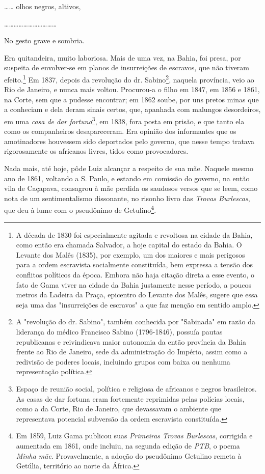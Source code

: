 \ldots{}\ldots{} olhos negros, altivos,

\ldots\ldots\ldots\ldots\ldots\ldots\ldots\ldots\ldots\ldots\ldots{}

No gesto grave e sombria.

Era quitandeira, muito laboriosa. Mais de uma vez, na Bahia, foi presa,
por suspeita de envolver-se em planos de insurreições de escravos, que
não tiveram efeito.\footnote{A década de 1830 foi especialmente
  agitada e revoltosa na cidade da Bahia, como então era chamada
  Salvador, a hoje capital do estado da Bahia. O Levante dos Malês
  (1835), por exemplo, um dos maiores e mais perigosos para a ordem
  escravista socialmente constituída, bem expressa a tensão dos
  conflitos políticos da época. Embora não haja citação direta a esse
  evento, o fato de Gama viver na cidade da Bahia justamente nesse
  período, a poucos metros da Ladeira da Praça, epicentro do Levante dos
  Malês, sugere que essa seja uma das "insurreições de escravos" a que
  faz menção em sentido amplo.} Em 1837, depois da revolução do dr.
Sabino\footnote{A "revolução do dr. Sabino", também conhecida por
  "Sabinada" em razão da liderança do médico Francisco Sabino
  (1796-1846), possuía pautas republicanas e reivindicava maior
  autonomia da então província da Bahia frente ao Rio de Janeiro, sede
  da administração do Império, assim como a redivisão de poderes locais,
  incluindo grupos com baixa ou nenhuma representação política.},
naquela província, veio ao Rio de Janeiro, e nunca mais voltou.
Procurou-a o filho em 1847, em 1856 e 1861, na Corte, sem que a pudesse
encontrar; em 1862 soube, por uns pretos minas que a conheciam e dela
deram sinais certos, que, apanhada com malungos desordeiros, em uma
\emph{casa de dar fortuna}\footnote{Espaço de reunião social, política
  e religiosa de africanos e negros brasileiros. As casas de dar fortuna
  eram fortemente reprimidas pelas polícias locais, como a da Corte, Rio
  de Janeiro, que devassavam o ambiente que representava potencial
  subversão da ordem escravista constituída.}, em 1838, fora posta em
prisão, e que tanto ela como os companheiros desapareceram. Era opinião
dos informantes que os amotinadores houvessem sido deportados pelo
governo, que nesse tempo tratava rigorosamente os africanos livres,
tidos como provocadores.

Nada mais, até hoje, pôde Luiz alcançar a respeito de sua mãe. Naquele
mesmo ano de 1861, voltando a S. Paulo, e estando em comissão do
governo, na então vila de Caçapava, consagrou à mãe perdida os saudosos
versos que se leem, como nota de um sentimentalismo dissonante, no
risonho livro das \emph{Trovas Burlescas}, que deu à lume com o
pseudônimo de Getulino\footnote{Em 1859, Luiz Gama publicou suas
  \emph{Primeiras Trovas Burlescas}, corrigida e aumentada em 1861, onde
  incluiu, na segunda edição de \emph{PTB}, o poema \emph{Minha mãe}.
  Provavelmente, a adoção do pseudônimo Getulino remeta à Getúlia,
  território ao norte da África.}.

